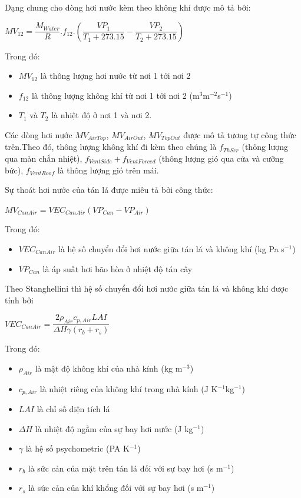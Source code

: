\documentclass[a4paper]{article}
\begin{document}
    Dạng chung cho dòng hơi nước kèm theo không khí được mô tả bới:
    \begin{center}
        $MV_{12} = \dfrac{M_{Water}}{R}.f_{12}.\left(\dfrac{VP_1}{T_1 + 273.15} - \dfrac{VP_2}{T_2 + 273.15}\right)$
    \end{center}
    Trong đó:
    \begin{itemize}
        \item $MV_{12}$ là thông lượng hơi nước từ nơi 1 tới nơi 2
        \item $f_{12}$ là thông lượng không khí từ nơi 1 tới nơi 2 (m$^3$m$^{-2}$s$^{-1}$)
        \item $T_1$ và $T_2$ là nhiệt độ ở nơi 1 và nơi 2.
    \end{itemize}
    Các dòng hơi nước $MV_{AirTop}$, $MV_{AirOut}$, $MV_{TopOut}$ được mô tả tương tự công thức trên.Theo đó, thông lượng không khí đi kèm theo chúng là $f_{ThScr}$ (thông lượng qua màn chắn nhiệt), $f_{VentSide} + f_{VentForced}$ (thông lượng gió qua cửa và cưỡng bức), $f_{VentRoof}$ là thông lượng gió trên mái.
    
    \vspace{5mm}
    
    Sự thoát hơi nước của tán lá được miêu tả bởi công thức:
    \begin{center}
        $MV_{CanAir} = VEC_{CanAir}(VP_{Can} - VP_{Air})$
    \end{center}
    Trong đó:
    \begin{itemize}
        \item $VEC_{CanAir}$ là hệ số chuyển đổi hơi nước giữa tán lá và không khí (kg Pa s$^{-1}$)
        \item $VP_{Can}$ là áp suất hơi bão hòa ở nhiệt độ tán cây
    \end{itemize}
    
    Theo Stanghellini thì hệ số chuyển đổi hơi nước giữa tán lá và không khí được tính bởi
    \begin{center}
        $VEC_{CanAir} = \dfrac{2\rho_{Air}c_{p,Air}LAI}{\Delta H \gamma(r_b + r_s)}$
    \end{center}
    Trong đó:
    \begin{itemize}
        \item $\rho_{Air}$ là mật độ không khí của nhà kính (kg m$^{-3}$)
        \item $c_{p,Air}$ là nhiệt riêng của không khí trong nhà kính (J K$^{-1}$kg$^{-1}$)
        \item $LAI$ là chỉ số diện tích lá 
        \item $\Delta H$ là nhiệt độ ngầm của sự bay hơi nước (J kg$^{-1}$)
        \item $\gamma$ là hệ số psychometric (PA K$^{-1}$)
        \item $r_b$ là sức cản của mặt trên tán lá đối với sự bay hơi (s m$^{-1}$)
        \item $r_s$ là sức cản của khí khổng đối với sự bay hơi (s m$^{-1}$)
    \end{itemize}
    
\end{document}
